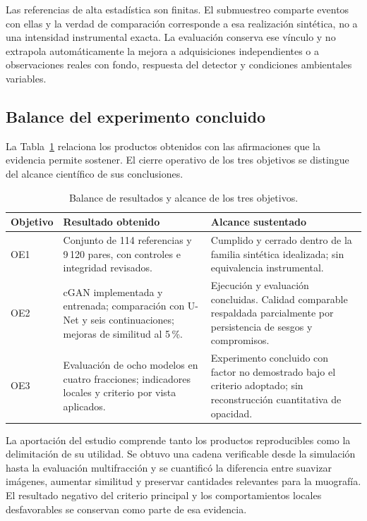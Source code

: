 Las referencias de alta estadística son finitas. El submuestreo comparte eventos con ellas y la verdad de comparación corresponde a esa realización sintética, no a una intensidad instrumental exacta. La evaluación conserva ese vínculo y no extrapola automáticamente la mejora a adquisiciones independientes o a observaciones reales con fondo, respuesta del detector y condiciones ambientales variables.

\subsection{Balance del experimento concluido}
La Tabla~\ref{tab:res-balance} relaciona los productos obtenidos con las afirmaciones que la evidencia permite sostener. El cierre operativo de los tres objetivos se distingue del alcance científico de sus conclusiones.
\begin{table}[htbp]\centering\small
\caption{Balance de resultados y alcance de los tres objetivos.}\label{tab:res-balance}
\begin{tabularx}{\linewidth}{@{}p{1.5cm}>{\raggedright\arraybackslash}X>{\raggedright\arraybackslash}X@{}}\toprule
Objetivo & Resultado obtenido & Alcance sustentado\\\midrule
OE1 & Conjunto de 114 referencias y 9\,120 pares, con controles e integridad revisados. & Cumplido y cerrado dentro de la familia sintética idealizada; sin equivalencia instrumental.\\
OE2 & cGAN implementada y entrenada; comparación con U-Net y seis continuaciones; mejoras de similitud al 5\,\%. & Ejecución y evaluación concluidas. Calidad comparable respaldada parcialmente por persistencia de sesgos y compromisos.\\
OE3 & Evaluación de ocho modelos en cuatro fracciones; indicadores locales y criterio por vista aplicados. & Experimento concluido con factor no demostrado bajo el criterio adoptado; sin reconstrucción cuantitativa de opacidad.\\\bottomrule
\end{tabularx}\end{table}

La aportación del estudio comprende tanto los productos reproducibles como la delimitación de su utilidad. Se obtuvo una cadena verificable desde la simulación hasta la evaluación multifracción y se cuantificó la diferencia entre suavizar imágenes, aumentar similitud y preservar cantidades relevantes para la muografía. El resultado negativo del criterio principal y los comportamientos locales desfavorables se conservan como parte de esa evidencia.

\FloatBarrier
